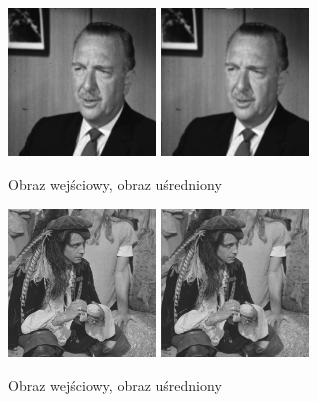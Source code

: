 \documentclass[final,a4paper,openany,12pt]{mwbk}
\begin{document}
\begin{figure}[H]
	\begin{center}
		\includegraphics[width=0.35\textwidth]{gentelman_gray}
		\includegraphics[width=0.35\textwidth]{gentelman_gray_lowpassAvg_result}
	\end{center}
	\caption{Obraz wejściowy, obraz uśredniony}
\end{figure}

\begin{figure}[H]
	\begin{center}
		\includegraphics[width=0.35\textwidth]{pirate_gray}
		\includegraphics[width=0.35\textwidth]{pirate_gray_lowpassAvg_result}
	\end{center}
	\caption{Obraz wejściowy, obraz uśredniony}
\end{figure}
\end{document}
